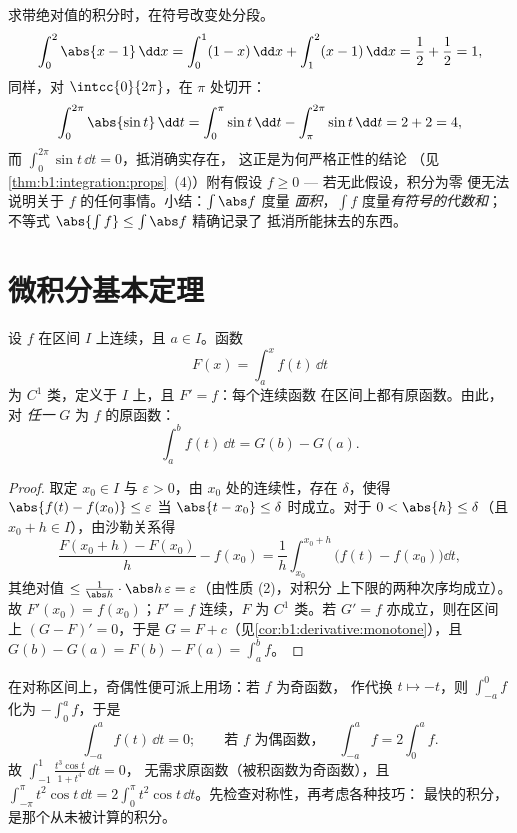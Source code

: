 \begin{example}\label{ex:b1:integration:chasleswork}
求带绝对值的积分时，在符号改变处分段。
\[
\int_0^2 \abs{x - 1}\,\dd x
= \int_0^1 (1 - x)\,\dd x + \int_1^2 (x - 1)\,\dd x
= \frac12 + \frac12 = 1 ,
\]
同样，对 $\intcc{0}{2\pi}$，在 $\pi$ 处切开：
\[
\int_0^{2\pi} \abs{\sin t}\,\dd t
= \int_0^{\pi} \sin t\,\dd t - \int_{\pi}^{2\pi} \sin t\,\dd t
= 2 + 2 = 4 ,
\]
而 $\int_0^{2\pi} \sin t\,\dd t = 0$，抵消确实存在，
这正是为何严格正性的结论
（见\cref{thm:b1:integration:props}~(4)）附有假设 $f
\geq 0$ --- 若无此假设，积分为零
便无法说明关于 $f$ 的任何事情。小结：$\int \abs f$ 度量
\emph{面积}，$\int f$ 度量\emph{有符号的代数和}；
不等式 $\abs{\int f} \leq \int\abs f$ 精确记录了
抵消所能抹去的东西。
\end{example}

\section{微积分基本定理}

\begin{theorem}[微积分基本定理]\label{thm:b1:integration:ftc}
设 $f$ 在区间 $I$ 上连续，且 $a \in I$。函数
\[
F(x) = \int_a^x f(t)\, \dd t
\]
为 $C^1$ 类，定义于 $I$ 上，且 $F' = f$：每个连续函数
在区间上都有原函数。由此，对 \emph{任一}
$G$ 为 $f$ 的原函数：
\[
\int_a^b f(t)\,\dd t = G(b) - G(a) .
\]
\end{theorem}

\begin{proof}
取定 $x_0 \in I$ 与 $\varepsilon > 0$，由 $x_0$ 处的连续性，存在
$\delta$，使得 $\abs{f(t) - f(x_0)} \leq \varepsilon$ 当 $\abs{t -
x_0} \leq \delta$ 时成立。对于 $0 < \abs{h} \leq \delta$（且 $x_0 + h \in
I$），由沙勒关系得
\[
\frac{F(x_0 + h) - F(x_0)}{h} - f(x_0)
= \frac 1h \int_{x_0}^{x_0+h} \bigl(f(t) - f(x_0)\bigr)\dd t ,
\]
其绝对值 $\leq \frac{1}{\abs h}\cdot \abs h\,
\varepsilon = \varepsilon$（由性质 (2)，对积分
上下限的两种次序均成立）。故 $F'(x_0) = f(x_0)$；$F' = f$ 连续，$F$ 为
$C^1$ 类。若 $G' = f$ 亦成立，则在区间上 $(G - F)' = 0$，于是 $G =
F + c$（见\cref{cor:b1:derivative:monotone}），且 $G(b) - G(a) = F(b)
- F(a) = \int_a^b f$。
\end{proof}

\begin{example}[计算前先看对称性]\label{ex:b1:integration:parity}
在对称区间上，奇偶性便可派上用场：若 $f$ 为奇函数，
作代换 $t \mapsto -t$，则 $\int_{-a}^{0} f$ 化为
$-\int_0^a f$，于是
\[
\int_{-a}^{a} f(t)\,\dd t = 0 ;
\qquad\text{若 $f$ 为偶函数，}\quad
\int_{-a}^{a} f = 2\int_0^a f .
\]
故 $\int_{-1}^{1} \frac{t^3\cos t}{1 + t^4}\,\dd t = 0$，
无需求原函数（被积函数为奇函数），且
$\int_{-\pi}^{\pi} t^2\cos t\,\dd t = 2\int_0^\pi t^2\cos t\,
\dd t$。先检查对称性，再考虑各种技巧：
最快的积分，是那个从未被计算的积分。
\end{example}

